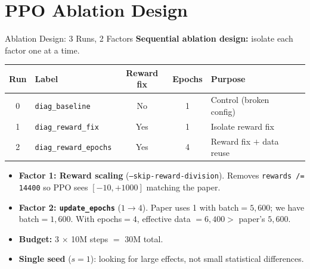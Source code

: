\documentclass[aspectratio=169,11pt]{beamer}
\begin{document}
\section{PPO Ablation Design}

\begin{frame}{Ablation Design: 3 Runs, 2 Factors}
  \textbf{Sequential ablation design:} isolate each factor one at a time.

  \medskip
  \begin{center}
  \small
  \begin{tabular}{clcclp{4.5cm}}
    \toprule
    \textbf{Run} & \textbf{Label} & \textbf{Reward fix} & \textbf{Epochs} & \textbf{Purpose} \\
    \midrule
    0 & \texttt{diag\_baseline}      & No  & 1 & Control (broken config) \\
    1 & \texttt{diag\_reward\_fix}   & \textcolor{good}{Yes} & 1 & Isolate reward fix \\
    2 & \texttt{diag\_reward\_epochs}& \textcolor{good}{Yes} & \textcolor{good}{4} & Reward fix $+$ data reuse \\
    \bottomrule
  \end{tabular}
  \end{center}

  \bigskip
  \begin{itemize}
    \item \textbf{Factor 1: Reward scaling} (\texttt{--skip-reward-division}).
      Removes \texttt{rewards /= 14400} so PPO sees $[-10, +1000]$ matching the paper.
    \item \textbf{Factor 2: \texttt{update\_epochs}} ($1 \to 4$).
      Paper uses 1 with batch${}=5{,}600$; we have batch${}=1{,}600$.
      With epochs${}=4$, effective data $= 6{,}400 >$ paper's $5{,}600$.
    \item \textbf{Budget:} 3 $\times$ 10M steps $=$ 30M total.
    \item \textbf{Single seed} ($s{=}1$): looking for large effects, not small statistical differences.
  \end{itemize}
\end{frame}
\end{document}
